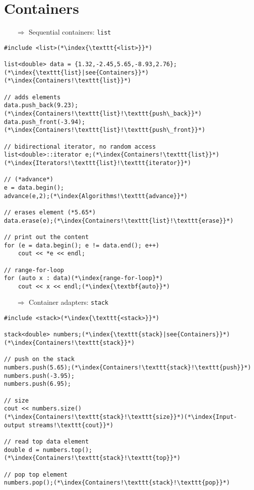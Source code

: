 \documentclass[10pt]{article}
\begin{document}
\section{Containers}
\small
\begin{enumerate}
\item[$\Rightarrow$] Sequential containers: \texttt{list}
\end{enumerate}
\begin{lstlisting}
#include <list>(*\index{\texttt{<list>}}*)

list<double> data = {1.32,-2.45,5.65,-8.93,2.76};(*\index{\texttt{list}|see{Containers}}*)(*\index{Containers!\texttt{list}}*)

// adds elements
data.push_back(9.23);(*\index{Containers!\texttt{list}!\texttt{push\_back}}*)
data.push_front(-3.94);(*\index{Containers!\texttt{list}!\texttt{push\_front}}*)

// bidirectional iterator, no random access    
list<double>::iterator e;(*\index{Containers!\texttt{list}}*)(*\index{Iterators!\texttt{list}!\texttt{iterator}}*)

// (*advance*)
e = data.begin();
advance(e,2);(*\index{Algorithms!\texttt{advance}}*)

// erases element (*5.65*)
data.erase(e);(*\index{Containers!\texttt{list}!\texttt{erase}}*)

// print out the content    
for (e = data.begin(); e != data.end(); e++)
    cout << *e << endl;
    
// range-for-loop
for (auto x : data)(*\index{range-for-loop}*)
    cout << x << endl;(*\index{\textbf{auto}}*)
\end{lstlisting}
\begin{enumerate}
\item[$\Rightarrow$] Container adapters: \texttt{stack}
\end{enumerate}
\begin{lstlisting}
#include <stack>(*\index{\texttt{<stack>}}*)

stack<double> numbers;(*\index{\texttt{stack}|see{Containers}}*)(*\index{Containers!\texttt{stack}}*)

// push on the stack
numbers.push(5.65);(*\index{Containers!\texttt{stack}!\texttt{push}}*)
numbers.push(-3.95);
numbers.push(6.95);

// size
cout << numbers.size()(*\index{Containers!\texttt{stack}!\texttt{size}}*)(*\index{Input-output streams!\texttt{cout}}*)

// read top data element
double d = numbers.top();(*\index{Containers!\texttt{stack}!\texttt{top}}*)

// pop top element
numbers.pop();(*\index{Containers!\texttt{stack}!\texttt{pop}}*)
\end{lstlisting}
\end{document}
